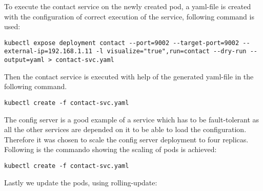 To execute the contact service on the newly created pod, a yaml-file is created with the configuration of correct execution of the service, following command is used:
\begin{lstlisting}[frame=single, ]
kubectl expose deployment contact --port=9002 --target-port=9002 --external-ip=192.168.1.11 -l visualize="true",run=contact --dry-run --output=yaml > contact-svc.yaml
\end{lstlisting}

Then the contact service is executed with help of the generated yaml-file in the following command.
\begin{lstlisting}[frame=single, ]
kubectl create -f contact-svc.yaml
\end{lstlisting}

The config server is a good example of a service which has to be fault-tolerant as all the other services are depended on it to be able to load the configuration. Therefore it was chosen to scale the config server deployment to four replicas. Following is the commando showing the scaling of pods is achieved:
\begin{lstlisting}[frame=single, ]
kubectl create -f contact-svc.yaml
\end{lstlisting}



Lastly we update the pods, using rolling-update:






